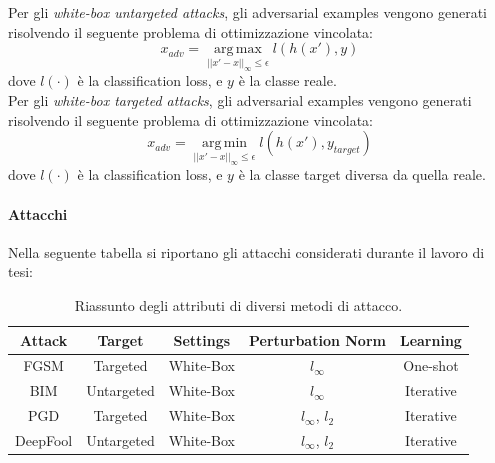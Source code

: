     \newline
    Per gli \textit{white-box untargeted attacks}, gli adversarial examples vengono generati risolvendo il seguente problema di ottimizzazione vincolata:
        \begin{equation}
            x_{adv}=\operatorname*{arg\,max}_{||x'-x||_\infty \leq \epsilon}l(h(x'),y)
        \end{equation}
        dove $l(\cdot)$ è la classification loss, e $y$ è la classe reale.\\
    \newline
    Per gli \textit{white-box targeted attacks}, gli adversarial examples vengono generati risolvendo il seguente problema di ottimizzazione vincolata:
        \begin{equation}
            x_{adv}=\operatorname*{arg\,min}_{||x'-x||_\infty \leq \epsilon}l(h(x'),y_{target})
        \end{equation}
        dove $l(\cdot)$ è la classification loss, e $y$ è la classe target diversa da quella reale.
    \newpage

    \paragraph{Attacchi} Nella seguente tabella si riportano gli attacchi considerati durante il lavoro di tesi:
        \begin{table}[!h]
            \centering
            \begin{tabular}{|c|c|c|c|c|}
                \hline
                \rule[-3mm]{0mm}{8mm}
                \textbf{Attack}   &\textbf{Target}  & \textbf{Settings} & \textbf{Perturbation Norm} & \textbf{Learning}  \\ \hline \hline
                \rule[-3mm]{0mm}{8mm}
                FGSM     & Targeted             & White-Box       & $l_\infty$        & One-shot  \\ \hline
                \rule[-3mm]{0mm}{8mm}
                BIM      & Untargeted           & White-Box       & $l_\infty$        & Iterative \\ \hline
                \rule[-3mm]{0mm}{8mm}
                PGD      & Targeted             & White-Box       & $l_\infty$, $l_2$ & Iterative \\ \hline
                \rule[-3mm]{0mm}{8mm}
                DeepFool & Untargeted           & White-Box       & $l_\infty$, $l_2$ & Iterative \\ \hline
            \end{tabular}
            \caption{Riassunto degli attributi di diversi metodi di attacco.}
            \label{Tab Attacks}
        \end{table}
    
